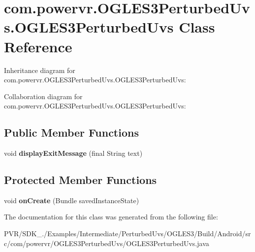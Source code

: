 \hypertarget{classcom_1_1powervr_1_1_o_g_l_e_s3_perturbed_uvs_1_1_o_g_l_e_s3_perturbed_uvs}{\section{com.\+powervr.\+O\+G\+L\+E\+S3\+Perturbed\+Uvs.\+O\+G\+L\+E\+S3\+Perturbed\+Uvs Class Reference}
\label{classcom_1_1powervr_1_1_o_g_l_e_s3_perturbed_uvs_1_1_o_g_l_e_s3_perturbed_uvs}
}


Inheritance diagram for com.\+powervr.\+O\+G\+L\+E\+S3\+Perturbed\+Uvs.\+O\+G\+L\+E\+S3\+Perturbed\+Uvs\+:


Collaboration diagram for com.\+powervr.\+O\+G\+L\+E\+S3\+Perturbed\+Uvs.\+O\+G\+L\+E\+S3\+Perturbed\+Uvs\+:
\subsection*{Public Member Functions}
\begin{DoxyCompactItemize}
\item 
\hypertarget{classcom_1_1powervr_1_1_o_g_l_e_s3_perturbed_uvs_1_1_o_g_l_e_s3_perturbed_uvs_affdcec20f7b4ae172372dcf009e55c51}{void {\bfseries display\+Exit\+Message} (final String text)}\label{classcom_1_1powervr_1_1_o_g_l_e_s3_perturbed_uvs_1_1_o_g_l_e_s3_perturbed_uvs_affdcec20f7b4ae172372dcf009e55c51}

\end{DoxyCompactItemize}
\subsection*{Protected Member Functions}
\begin{DoxyCompactItemize}
\item 
\hypertarget{classcom_1_1powervr_1_1_o_g_l_e_s3_perturbed_uvs_1_1_o_g_l_e_s3_perturbed_uvs_a20af10c70fbd02b63994808f88113352}{void {\bfseries on\+Create} (Bundle saved\+Instance\+State)}\label{classcom_1_1powervr_1_1_o_g_l_e_s3_perturbed_uvs_1_1_o_g_l_e_s3_perturbed_uvs_a20af10c70fbd02b63994808f88113352}

\end{DoxyCompactItemize}


The documentation for this class was generated from the following file\+:\begin{DoxyCompactItemize}
\item 
P\+V\+R/\+S\+D\+K\+\_./\+Examples/\+Intermediate/\+Perturbed\+Uvs/\+O\+G\+L\+E\+S3/\+Build/\+Android/src/com/powervr/\+O\+G\+L\+E\+S3\+Perturbed\+Uvs/O\+G\+L\+E\+S3\+Perturbed\+Uvs.\+java\end{DoxyCompactItemize}
